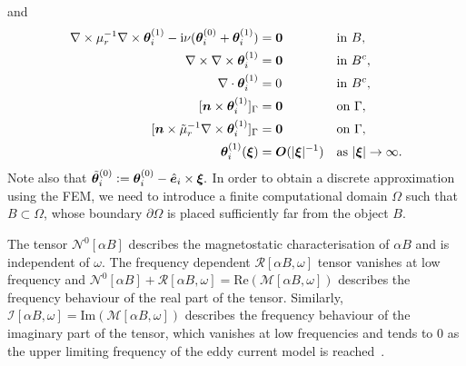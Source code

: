 and 
\begin{subequations}
\label{eqn:Theta1}
\begin{align}
\nabla\times\mu_r^{-1}\nabla\times\bm{\theta}_i^{(1)}-\mathrm{i} \nu  (\bm{\theta}_i^{(0)}+\bm{\theta}_i^{(1)})&=\bm{0}&&\textrm{in }B,\\
\nabla \times \nabla \times \bm{\theta}_i^{(1)} &= \bm{0} && \text{in }B^c,\\
\nabla\cdot\bm{\theta}_i^{(1)}&=0&&\textrm{in }B^c,\\
[{\bm{n}}\times\bm{\theta}_i^{(1)}]_{\Gamma}&=\bm{0}&&\textrm{on }\Gamma,\\
[{\bm{n}}\times\tilde{\mu}_r^{-1}\nabla\times\bm{\theta}_i^{(1)}]_{\Gamma}&=\bm{0}&&\textrm{on }\Gamma,\\
\bm{\theta}_i^{(1)}(\bm{\xi})&=\bm{O}(|\bm{\xi}|^{-1})&&\textrm{as }|\bm{\xi}|\rightarrow\infty.
\end{align}
\end{subequations}
Note also that $\tilde{\bm{\theta}}_i^{(0)}\vcentcolon=\bm{\theta}_i^{(0)}-\hat{\bm{e}}_i\times\bm{\xi}.$ In order to obtain a discrete approximation using the FEM, we need to introduce a finite computational domain $\Omega$ such that $B\subset\Omega$, whose boundary $\partial\Omega$ is placed sufficiently far from the object $B$. 

The tensor $\mathcal{N}^0[ \alpha B] $ describes the magnetostatic characterisation of $\alpha B$ and is independent of $\omega$. The frequency dependent $\mathcal{R}[\alpha B, \omega]$ tensor vanishes at low frequency and $\mathcal{N}^0[\alpha B]+\mathcal{R}[\alpha B , \omega] =\text{Re}( {\mathcal M} [ \alpha B, \omega]) $ describes the frequency behaviour of the real part of the tensor. Similarly, $\mathcal{I}[\alpha B, \omega] = \text{Im}( {\mathcal M} [ \alpha B, \omega])$ describes the frequency behaviour of the imaginary part of the tensor, which vanishes at low frequencies and  tends to $0$ as the upper limiting frequency of the eddy current model is reached~\cite{LedgerLionheart2019}.

